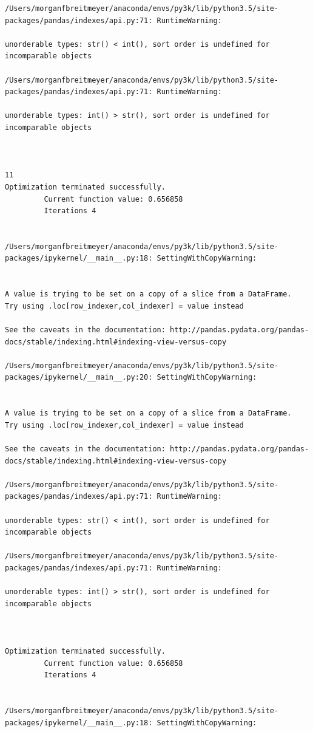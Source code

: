 \begin{lstlisting}
/Users/morganfbreitmeyer/anaconda/envs/py3k/lib/python3.5/site-packages/pandas/indexes/api.py:71: RuntimeWarning:

unorderable types: str() < int(), sort order is undefined for incomparable objects

/Users/morganfbreitmeyer/anaconda/envs/py3k/lib/python3.5/site-packages/pandas/indexes/api.py:71: RuntimeWarning:

unorderable types: int() > str(), sort order is undefined for incomparable objects



11
Optimization terminated successfully.
         Current function value: 0.656858
         Iterations 4


/Users/morganfbreitmeyer/anaconda/envs/py3k/lib/python3.5/site-packages/ipykernel/__main__.py:18: SettingWithCopyWarning:


A value is trying to be set on a copy of a slice from a DataFrame.
Try using .loc[row_indexer,col_indexer] = value instead

See the caveats in the documentation: http://pandas.pydata.org/pandas-docs/stable/indexing.html#indexing-view-versus-copy

/Users/morganfbreitmeyer/anaconda/envs/py3k/lib/python3.5/site-packages/ipykernel/__main__.py:20: SettingWithCopyWarning:


A value is trying to be set on a copy of a slice from a DataFrame.
Try using .loc[row_indexer,col_indexer] = value instead

See the caveats in the documentation: http://pandas.pydata.org/pandas-docs/stable/indexing.html#indexing-view-versus-copy

/Users/morganfbreitmeyer/anaconda/envs/py3k/lib/python3.5/site-packages/pandas/indexes/api.py:71: RuntimeWarning:

unorderable types: str() < int(), sort order is undefined for incomparable objects

/Users/morganfbreitmeyer/anaconda/envs/py3k/lib/python3.5/site-packages/pandas/indexes/api.py:71: RuntimeWarning:

unorderable types: int() > str(), sort order is undefined for incomparable objects



Optimization terminated successfully.
         Current function value: 0.656858
         Iterations 4


/Users/morganfbreitmeyer/anaconda/envs/py3k/lib/python3.5/site-packages/ipykernel/__main__.py:18: SettingWithCopyWarning:



\end{lstlisting}

